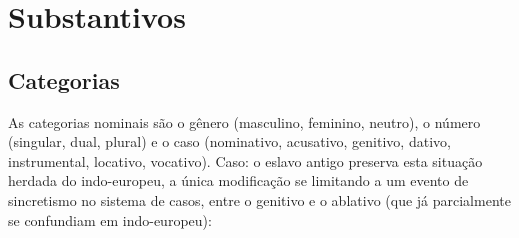 
\section{Substantivos}

\subsection{Categorias}
As categorias nominais são o gênero (masculino, feminino, neutro), o número (singular, dual, plural) e o caso (nominativo, acusativo, genitivo, dativo, instrumental, locativo, vocativo).
Caso: o eslavo antigo preserva esta situação herdada do indo-europeu, a única modificação se limitando a um evento de sincretismo no sistema de casos, entre o genitivo e o ablativo (que já parcialmente se confundiam em indo-europeu):

